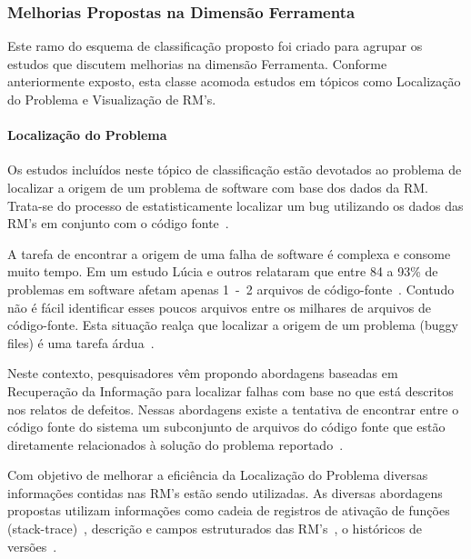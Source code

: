 \subsubsection{Melhorias Propostas na Dimensão Ferramenta}
\label{ssub:melhorias_dim_ferramenta}

Este ramo do esquema de classificação proposto foi criado para agrupar os
estudos que discutem melhorias na dimensão Ferramenta. Conforme anteriormente
exposto, esta classe acomoda estudos em tópicos como Localização do Problema e
Visualização de RM's.

\paragraph{Localização do Problema} Os estudos incluídos neste tópico de
classificação estão devotados ao problema de localizar a origem de um problema
de software com base dos dados da RM\@.  Trata-se do processo de
estatisticamente localizar um bug utilizando os dados das RM's em conjunto com o
código fonte~\cite{Hovemeyer:2004:FBE:1052883.1052895}.

A tarefa de encontrar a origem de uma falha de software é complexa e consome
muito tempo. Em um estudo Lúcia e outros relataram que entre 84 a 93\% de
problemas em software afetam apenas 1~-~2 arquivos de
código-fonte~\cite{thung2012faults}. Contudo não é fácil identificar esses
poucos arquivos entre os milhares de arquivos de código-fonte. Esta situação
realça que localizar a origem de um problema (buggy files) é uma tarefa
árdua~\cite{Thung:2014:BIT:2635868.2661678}.

Neste contexto, pesquisadores vêm propondo abordagens baseadas em Recuperação da
Informação para localizar falhas com base no que está descritos nos relatos de
defeitos. Nessas abordagens existe a tentativa de encontrar entre o código fonte
do sistema um subconjunto de arquivos do código fonte que estão diretamente
relacionados à solução do problema
reportado~\cite{Wong:2014:BBF:2705615.2706096}.

Com objetivo de melhorar a eficiência da Localização do Problema diversas
informações contidas nas RM's estão sendo utilizadas. As diversas abordagens
propostas utilizam informações como cadeia de registros de ativação de funções
(stack-trace)~\cite{Wong:2014:BBF:2705615.2706096}, des\-cri\-ção e campos
estruturados das RM's~\cite{Thung:2014:BIT:2635868.2661678}, o históricos de
versões~\cite{Bangcharoensap:2012:LSC:2419061.2419428,corley2011recovering,Romo:2015:TAT:2745802.2745833}.

